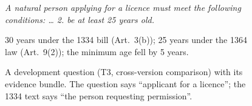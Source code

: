 \begin{figure}[t]
\begin{tcolorbox}[excard, title={Evidence bundle\enspace two documents}]
\begin{tcolorbox}[exdoc, colframe=cLex, colback=cLex!6]
\begin{otherlanguage}{persian}
\end{otherlanguage}
{\footnotesize\color{cAxis}\textit{A natural person applying for a licence must meet the following conditions: \ldots{} 2. be at least 25 years old.}\par}
\end{tcolorbox}
\end{tcolorbox}
\begin{tcolorbox}[excard, title={Expected answer\enspace gloss}]
30 years under the 1334 bill (Art.~3(b)); 25 years under the 1364 law (Art.~9(2)); the minimum age fell by 5 years.
\end{tcolorbox}
\caption{A development question (T3, cross-version comparison) with its evidence bundle. The question says ``applicant for a licence''; the 1334 text says ``the person requesting permission''.}
\label{fig:example}
\end{figure}
